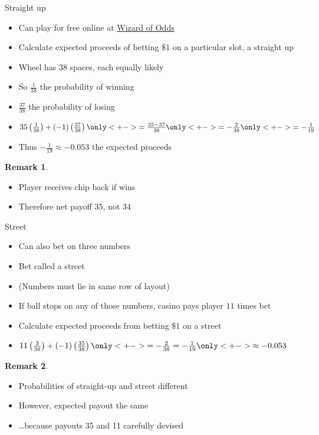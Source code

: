 \documentclass[handout]{beamer}
\theoremstyle{definition}
\newtheorem{remark}{Remark}
\begin{document}
\begin{frame}{Straight up}
\begin{itemize}
\item Can play for free online at
\href{http://wizardofodds.com/play/roulette}
{\color{blue}Wizard of Odds}
\item Calculate expected proceeds of betting $\$1$
on a particular slot, a \alert{straight up}
\item Wheel has $38$ spaces, each equally likely
\item So $\frac{1}{38}$ the probability of winning
\item $\frac{37}{38}$ the probability of losing
\item $35\left(\frac{1}{38}\right)
+\left(-1\right)\left(\frac{37}{38}\right)
\only<+->{=\frac{35-37}{38}}
\only<+->{=-\frac{2}{38}}
\only<+->{=-\frac{1}{19}}$
\item Thus $-\frac{1}{19}\approx -0.053$ the expected proceeds
\end{itemize}
\begin{remark}
\begin{itemize}
\item Player receives chip back if wins
\item Therefore net payoff $35$, not $34$
\end{itemize}
\end{remark}
\end{frame}

\begin{frame}{Street}
\begin{itemize}
\item Can also bet on three numbers
\item Bet called a \alert{street}
\item (Numbers must lie in same row of \alert{layout})
\item If ball stops on any of those numbers, casino
pays player $11$ times bet
\item Calculate expected proceeds from betting $\$1$ on a street
\item $11\left(\frac{3}{38}\right)+\left(-1\right)\left(\frac{35}{38}\right)
\only<+->{=-\frac{2}{38}=-\frac{1}{19}}
\only<+->{\approx -0.053}$
\end{itemize}
\begin{remark}
\begin{itemize}
\item Probabilities of straight-up and street different
\item However, expected payout the same
\item \dots because payouts 35 and 11 carefully devised
\end{itemize}
\end{remark}
\end{frame}
\end{document}
